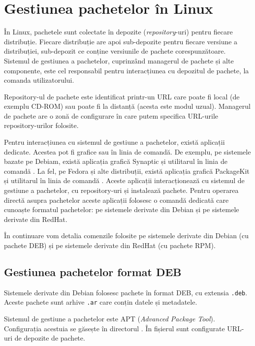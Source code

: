 \section{Gestiunea pachetelor în Linux}
\label{sec:package:linux}

În Linux, pachetele sunt colectate în depozite (\textit{repository}-uri) pentru fiecare distribuție. Fiecare distribuție are apoi sub-depozite pentru fiecare versiune a distribuției, sub-depozit ce conține versiunile de pachete corespunzătoare. Sistemul de gestiunea a pachetelor, cuprinzând managerul de pachete și alte componente, este cel responsabil pentru interacțiunea cu depozitul de pachete, la comanda utilizatorului.

Repository-ul de pachete este identificat printr-un URL care poate fi local (de exemplu CD-ROM) sau poate fi la distanță (acesta este modul uzual). Managerul de pachete are o zonă de configurare în care putem specifica URL-urile repository-urilor folosite.

Pentru interacțiunea cu sistemul de gestiune a pachetelor, există aplicații dedicate. Acestea pot fi grafice sau în linia de comandă. De exemplu, pe sistemele bazate pe Debiam, există aplicația grafică Synaptic și utilitarul în linia de comandă . La fel, pe Fedora și alte distribuții, există aplicația grafică PackageKit și utilitarul în linia de comandă . Aceste aplicații interacționează cu sistemul de gestiune a pachetelor, cu repository-uri și instalează pachete. Pentru operarea directă asupra pachetelor aceste aplicații folosesc o comandă dedicată care cunoaște formatul pachetelor:  pe sistemele derivate din Debian și  pe sistemele derivate din RedHat.

În continuare vom detalia comenzile folosite pe sistemele derivate din Debian (cu pachete DEB) și pe sistemele derivate din RedHat (cu pachete RPM).

\subsection{Gestiunea pachetelor format DEB}
\label{sec:package:deb}

Sistemele derivate din Debian folosesc pachete în format DEB, cu extensia \texttt{.deb}. Aceste pachete sunt arhive \texttt{.ar} care conțin datele și metadatele.

Sistemul de gestiune a pachetelor este APT  (\textit{Advanced Package Tool}). Configurația acestuia se găsește în directorul . În fișierul  sunt configurate URL-uri de depozite de pachete.

